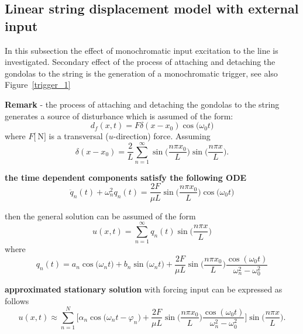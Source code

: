 \documentclass[12pt,a4paper]{scrartcl}
\begin{document}
\begin{onehalfspace}
\subsection{Linear string displacement model with external input}
In this subsection the effect of monochromatic input excitation to the line is investigated. Secondary effect of the process of attaching and detaching the gondolas to the string is the generation of a monochromatic trigger, see also Figure~\ref{trigger_1}


\noindent\textbf{Remark} - the process of attaching and detaching the gondolas to the string generates a source of disturbance which is assumed of the form:
\begin{equation}
	d_f(x,t) = F\delta(x-x_0)\cos\big(\omega_0 t\big)
\end{equation}
where $F\Big[\SI{}{\newton}\Big]$ is a transversal ($u$-direction) force. Assuming 
\begin{equation}
	\delta(x-x_0) = \frac{2}{L}\sum_{n=1}^{\infty}\sin\Big(\frac{n\pi x_0}{L}\Big)\sin\Big(\frac{n\pi x}{L}\Big).
\end{equation}
\begin{mybox}
	\textbf{the time dependent components satisfy the following ODE}
	\begin{equation}
		\ddot{q}_n(t)+\omega_n^2q_n(t) = \frac{2F}{\mu L}\sin\Big(\frac{n\pi x_0}{L}\Big)\cos\big(\omega_0 t\big)
	\end{equation}
\end{mybox}
then the general solution can be assumed of the form
\begin{equation}
	u(x,t) = \sum_{n=1}^{\infty}q_n(t)\sin\Big(\frac{n\pi x}{L}\Big)
\end{equation}
where
\begin{equation}
	q_n(t) = a_n\cos\big(\omega_n t\big) + b_n\sin\big(\omega_n t\big) + \frac{2F}{\mu L}\sin\Big(\frac{n\pi x_0}{L}\Big)\frac{\cos(\omega_0 t)}{\omega_n^2 - \omega_0^2} 
\end{equation}
\begin{mybox}
\textbf{approximated stationary solution} with forcing input can be expressed as follows
	\begin{equation}
		u(x,t) \approx \sum_{n=1}^{N}  \Bigg[\alpha_n\cos\big(\omega_n t - \varphi_n\big) + \frac{2F}{\mu L}\sin\Big(\frac{n\pi x_0}{L}\Big)\frac{\cos(\omega_0 t)}{\omega_n^2 - \omega_0^2}\Bigg] \sin\Big(\frac{n\pi x}{L}\Big).
	\end{equation}
\end{mybox}


\end{onehalfspace}
\end{document}
